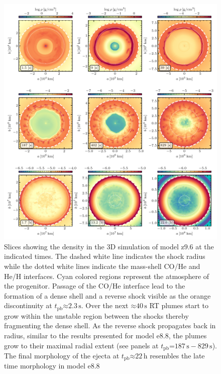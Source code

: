 \documentclass[fleqn,usenatbib]{mnras}
\newcommand{\tpb}{\ensuremath{t_{\text{pb}}}}
\newcommand{\s}{\ensuremath{\text{s}}}
\newcommand{\onemg}{\ensuremath{\mathrm{e8.8}}\xspace}
\newcommand{\znine}{\ensuremath{\mathrm{z9.6}}\xspace}
\begin{document}
\begin{figure}%
\includegraphics[width=\textwidth]{pic/z9_3d_3x3_den.pdf}
    \caption{Slices showing the density in the 3D simulation of model \znine 
        at the indicated times. 
    The dashed white line indicates the shock radius while the dotted white 
    lines indicate the mass-shell CO/He and He/H interfaces.  Cyan colored regions represent the atmosphere of the progenitor. 
    Passage of the CO/He interface lead to the formation of a dense shell 
    and a reverse shock
    visible as the orange discontinuity at $\tpb\mathord{\approx}2.3\,\s$. Over the 
    next $\mathord{\approx}40\,\s$ RT plumes
    start to grow within the unstable region between the shocks thereby fragmenting
    the dense shell.
    As the reverse shock propagates back in radius, similar to the 
    results presented for model \onemg, the plumes
    grow to their maximal radial extent 
    (see panels at $\tpb\mathord{=}187\,\s-829\,\s$).
    The final morphology of the ejecta at $\tpb\mathord{\approx}22\,\mathrm{h}$ resembles 
    the late time morphology in model \onemg}
\label{fig:z9 rho cuts}
\end{figure}%
\end{document}
